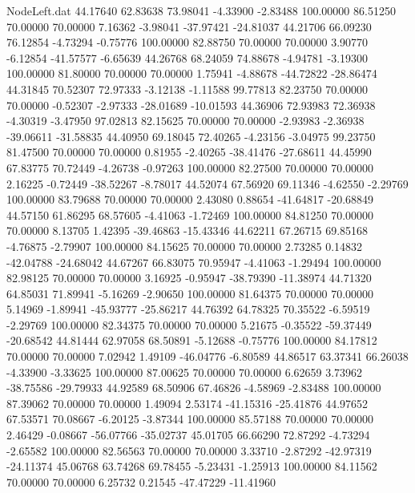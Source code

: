 \begin{filecontents}{NodeLeft.dat}
  44.17640   62.83638   73.98041    -4.33900   -2.83488  100.00000   86.51250   70.00000   70.00000    7.16362   -3.98041  -37.97421  -24.81037
  44.21706   66.09230   76.12854    -4.73294   -0.75776  100.00000   82.88750   70.00000   70.00000    3.90770   -6.12854  -41.57577   -6.65639
  44.26768   68.24059   74.88678    -4.94781   -3.19300  100.00000   81.80000   70.00000   70.00000    1.75941   -4.88678  -44.72822  -28.86474
  44.31845   70.52307   72.97333    -3.12138   -1.11588   99.77813   82.23750   70.00000   70.00000   -0.52307   -2.97333  -28.01689  -10.01593
  44.36906   72.93983   72.36938    -4.30319   -3.47950   97.02813   82.15625   70.00000   70.00000   -2.93983   -2.36938  -39.06611  -31.58835
  44.40950   69.18045   72.40265    -4.23156   -3.04975   99.23750   81.47500   70.00000   70.00000    0.81955   -2.40265  -38.41476  -27.68611
  44.45990   67.83775   70.72449    -4.26738   -0.97263  100.00000   82.27500   70.00000   70.00000    2.16225   -0.72449  -38.52267   -8.78017
  44.52074   67.56920   69.11346    -4.62550   -2.29769  100.00000   83.79688   70.00000   70.00000    2.43080    0.88654  -41.64817  -20.68849
  44.57150   61.86295   68.57605    -4.41063   -1.72469  100.00000   84.81250   70.00000   70.00000    8.13705    1.42395  -39.46863  -15.43346
  44.62211   67.26715   69.85168    -4.76875   -2.79907  100.00000   84.15625   70.00000   70.00000    2.73285    0.14832  -42.04788  -24.68042
  44.67267   66.83075   70.95947    -4.41063   -1.29494  100.00000   82.98125   70.00000   70.00000    3.16925   -0.95947  -38.79390  -11.38974
  44.71320   64.85031   71.89941    -5.16269   -2.90650  100.00000   81.64375   70.00000   70.00000    5.14969   -1.89941  -45.93777  -25.86217
  44.76392   64.78325   70.35522    -6.59519   -2.29769  100.00000   82.34375   70.00000   70.00000    5.21675   -0.35522  -59.37449  -20.68542
  44.81444   62.97058   68.50891    -5.12688   -0.75776  100.00000   84.17812   70.00000   70.00000    7.02942    1.49109  -46.04776   -6.80589
  44.86517   63.37341   66.26038    -4.33900   -3.33625  100.00000   87.00625   70.00000   70.00000    6.62659    3.73962  -38.75586  -29.79933
  44.92589   68.50906   67.46826    -4.58969   -2.83488  100.00000   87.39062   70.00000   70.00000    1.49094    2.53174  -41.15316  -25.41876
  44.97652   67.53571   70.08667    -6.20125   -3.87344  100.00000   85.57188   70.00000   70.00000    2.46429   -0.08667  -56.07766  -35.02737
  45.01705   66.66290   72.87292    -4.73294   -2.65582  100.00000   82.56563   70.00000   70.00000    3.33710   -2.87292  -42.97319  -24.11374
  45.06768   63.74268   69.78455    -5.23431   -1.25913  100.00000   84.11562   70.00000   70.00000    6.25732    0.21545  -47.47229  -11.41960

\end{filecontents}
